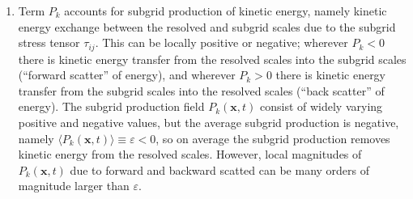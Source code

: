 \begin{enumerate}
    \item Term $P_{k}$ accounts for subgrid production of kinetic energy,
        namely kinetic energy exchange between the resolved and subgrid
        scales due to the subgrid stress tensor $\tau_{ij}$. This can be
        locally positive or negative; wherever $P_{k}<0$ there is kinetic
        energy transfer from the resolved scales into the subgrid scales
        (``forward scatter'' of energy), and wherever $P_{k}>0$ there is
        kinetic energy transfer from the subgrid scales into the resolved
        scales (``back scatter'' of energy). The subgrid production field
        $P_{k}(\mathbf{x}, t)$ consist of widely varying positive and negative
        values, but the average subgrid production is negative, namely
        $\langle P_{k}(\mathbf{x}, t) \rangle \equiv \varepsilon < 0$, so on
        average the subgrid production removes kinetic energy from the
        resolved scales. However, local magnitudes of $P_{k}(\mathbf{x}, t)$
        due to forward and backward scatted can be many orders of magnitude
        larger than $\varepsilon$.
        
\end{enumerate}

